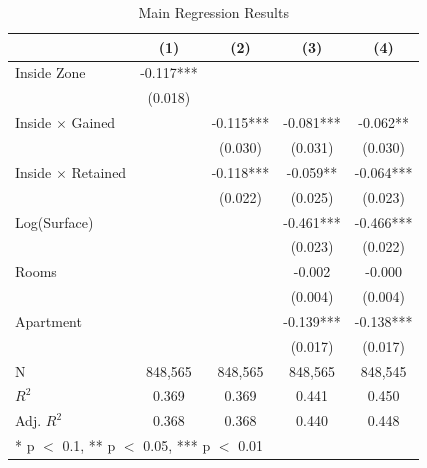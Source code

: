 \begin{table}
\caption{Main Regression Results}\label{tab:main}
\centering
\begin{tabular}[t]{lcccc}
\toprule
  & (1) & (2) & (3) & (4)\\
\midrule
Inside Zone & -0.117*** &  &  & \\
 & (0.018) &  &  & \\
Inside $\times$ Gained &  & -0.115*** & -0.081*** & -0.062**\\
 &  & (0.030) & (0.031) & (0.030)\\
Inside $\times$ Retained &  & -0.118*** & -0.059** & -0.064***\\
 &  & (0.022) & (0.025) & (0.023)\\
Log(Surface) &  &  & -0.461*** & -0.466***\\
 &  &  & (0.023) & (0.022)\\
Rooms &  &  & -0.002 & -0.000\\
 &  &  & (0.004) & (0.004)\\
Apartment &  &  & -0.139*** & -0.138***\\
 &  &  & (0.017) & (0.017)\\
\midrule
N & 848,565 & 848,565 & 848,565 & 848,545\\
$R^2$ & 0.369 & 0.369 & 0.441 & 0.450\\
Adj. $R^2$ & 0.368 & 0.368 & 0.440 & 0.448\\
\bottomrule
\multicolumn{5}{l}{\rule{0pt}{1em}* p $<$ 0.1, ** p $<$ 0.05, *** p $<$ 0.01}\\
\end{tabular}
\end{table}
